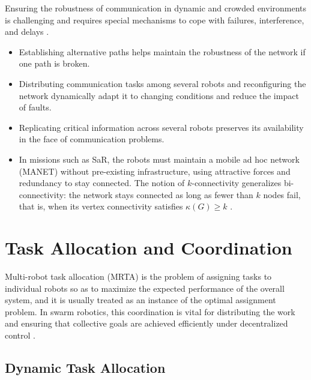 Ensuring the robustness of communication in dynamic and crowded environments is
challenging and requires special mechanisms to cope with failures, interference,
and delays \cite{bhowmick2024bio}.
\begin{itemize}
  \item {} Establishing alternative paths helps
        maintain the robustness of the network if one path is broken.
  \item {} Distributing communication
        tasks among several robots and reconfiguring the network dynamically
        adapt it to changing conditions and reduce the impact of faults.
  \item {} Replicating critical information across
        several robots preserves its availability in the face of communication
        problems.
  \item {} In missions such as SaR, the robots
        must maintain a mobile ad hoc network (MANET) without pre-existing
        infrastructure, using attractive forces and redundancy to stay
        connected. The notion of $k$-connectivity generalizes bi-connectivity:
        the network stays connected as long as fewer than $k$ nodes fail, that
        is, when its vertex connectivity satisfies $\kappa(G) \ge k$
        \cite{tan2016handbook}.
\end{itemize}

\section{Task Allocation and Coordination}\label{sec:task-allocation}

Multi-robot task allocation (MRTA) is the problem of assigning tasks to
individual robots so as to maximize the expected performance of the overall
system, and it is usually treated as an instance of the optimal assignment
problem. In swarm robotics, this coordination is vital for distributing the work
and ensuring that collective goals are achieved efficiently under decentralized
control \cite{brambilla2013swarm,yan2013survey}.

\subsection{Dynamic Task Allocation}

